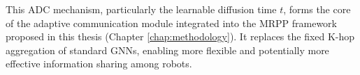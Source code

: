 This ADC mechanism, particularly the learnable diffusion time $t$, forms the core of the adaptive communication module integrated into the MRPP framework proposed in this thesis (Chapter \ref{chap:methodology}). It replaces the fixed K-hop aggregation of standard GNNs, enabling more flexible and potentially more effective information sharing among robots.


